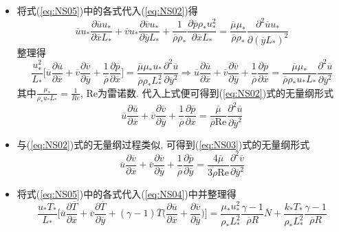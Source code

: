 \begin{solution}
\begin{itemize}
\item 将式(\ref{eq:NS05})中的各式代入(\ref{eq:NS02})得
\[
\overline{u}u_{*}\frac{\partial\overline{u}u_{*}}{\partial\overline{x}L_{*}}+\overline{v}u_{*}\frac{\partial\overline{v}u_{*}}{\partial\overline{y}L_{*}}+\frac{1}{\overline{\rho}\rho_{*}}\frac{\partial\overline{p}\rho_{*}u_{*}^{2}}{\partial\overline{x}L_{*}}
=\frac{\overline{\mu}\mu_{*}}{\overline{\rho}\rho_{*}}\frac{\partial^{2}\overline{u}u_{*}}{\partial(\overline{y}L_{*})^{2}}
\]
整理得
\[
\frac{u_{*}^{2}}{L_{*}}\Big[\overline{u}\frac{\partial\overline{u}}{\partial\overline{x}}+\overline{v}\frac{\partial\overline{v}}{\partial\overline{y}}+\frac{1}{\overline{\rho}}\frac{\partial\overline{p}}{\partial\overline{x}}\Big]
=\frac{\overline{\mu}\mu_{*}u_{*}}{\overline{\rho}\rho_{*}L_{*}^{2}}\frac{\partial^{2}\overline{u}}{\partial\overline{y}^2}
\Rightarrow
\overline{u}\frac{\partial\overline{u}}{\partial\overline{x}}+\overline{v}\frac{\partial\overline{v}}{\partial\overline{y}}+\frac{1}{\overline{\rho}}\frac{\partial\overline{p}}{\partial\overline{x}}
=\frac{\overline{\mu}\mu_{*}}{\overline{\rho}\rho_{*}u_{*}L_{*}}\frac{\partial^{2}\overline{u}}{\partial\overline{y}^2}
\]
其中$\frac{\mu_{*}}{\rho_{*}u_{*}L_{*}}=\frac{1}{Re}$, Re为雷诺数.
代入上式便可得到(\ref{eq:NS02})式的无量纲形式
\[
\overline{u}\frac{\partial\overline{u}}{\partial\overline{x}}+\overline{v}\frac{\partial\overline{v}}{\partial\overline{y}}+\frac{1}{\overline{\rho}}\frac{\partial\overline{p}}{\partial\overline{x}}
=\frac{\overline{\mu}}{\overline{\rho}\textrm{Re}}\frac{\partial^{2}\overline{u}}{\partial\overline{y}^2}
\]
\item 与(\ref{eq:NS02})式的无量纲过程类似, 可得到(\ref{eq:NS03})式的无量纲形式
\[
\overline{u}\frac{\partial\overline{v}}{\partial\overline{x}}
+\overline{v}\frac{\partial\overline{v}}{\partial\overline{y}}
+\frac{1}{\overline{\rho}}\frac{\partial\overline{p}}{\partial\overline{y}}
=\frac{4\overline{\mu}}{\overline{3\rho}\textrm{Re}}\frac{\partial^{2}\overline{v}}{\partial\overline{y}^2}
\]
\item 将式(\ref{eq:NS05})中的各式代入(\ref{eq:NS04})中并整理得
\[
\frac{u_{*}T_{*}}{L_{*}}\Big[\overline{u}\frac{\partial\overline{T}}{\partial\overline{x}}
+\overline{v}\frac{\partial\overline{T}}{\partial\overline{y}}
+(\gamma-1)\overline{T}\Big(\frac{\partial\overline{u}}{\partial\overline{x}}
+\frac{\partial\overline{v}}{\partial\overline{y}}\Big)\Big]
=
\frac{\mu_{*}u_{*}^2}{\rho_{*}L_{*}^{2}}
\frac{\gamma-1}{\overline{\rho}R}
\overline{N}
+\frac{k_*T_{*}}{\rho_{*}L_{*}^{2}}
\frac{\gamma-1}{\overline{\rho}R}
\]
\end{itemize}
\end{solution}
